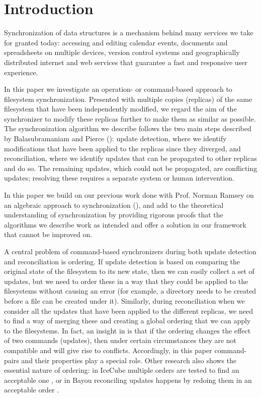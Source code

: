
\section{Introduction}

Synchronization of data structures
is a mechanism behind many services we take for granted today:
accessing and editing calendar events, documents and spreadsheets
on multiple devices, version control systems and
geographically distributed internet and web services that
guarantee a fast and responsive user experience.

In this paper we investigate an operation- or command-based approach
to filesystem synchronization.
Presented with multiple copies (replicas) of the same filesystem that have been independently modified,
we regard the aim of the synchronizer to modify these replicas further
to make them as similar as possible.
The synchronization algorithm we describe
follows the two main steps described by Balasubramaniam and Pierce (\cite{BP}):
update detection, where we identify modifications that have been applied to the replicas
since they diverged,
and reconciliation, where we identify updates that can be propagated to other replicas and do so.
The remaining updates, which could not be propagated, are conflicting updates;
resolving these requires a separate system or human intervention.

In this paper we build on our previous work done 
with Prof. Norman Ramsey
on an algebraic approach to synchronization
(\cite{NREC}),
and add to the theoretical understanding
of synchronization by providing rigorous proofs that the algorithms
we describe work as intended
and offer a solution in our framework that cannot be improved on.

A central problem of command-based synchronizers 
during both update detection and reconciliation
is ordering.
If update detection is based on comparing the original state of the filesystem
to its new state, then we can easily collect a set of updates,
but we need to order these in a way that they could be applied
to the filesystems without causing an error 
(for example, a directory needs to be created before a file can be created under it).
Similarly, during reconciliation when we consider all the updates that
have been applied to the different replicas, we need to find a way of
merging these and creating a global ordering that we can apply
to the filesystems.
In fact, an insight in \cite{NREC} is that
if the ordering changes the effect of two commands (updates),
then under certain circumstances they are not compatible and will give rise to conflicts.
Accordingly, in this paper command-pairs and their properties
play a special role.
Other research also shows the essential nature of ordering:
in IceCube multiple orders are tested to find an acceptable one \cite{KRSD},
or in Bayou reconciling updates happens by redoing them in an acceptable order \cite{TTPDSH}.

